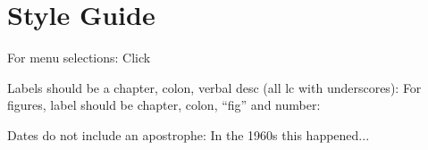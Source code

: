 \section{Style Guide}

For menu selections:
Click \textsc{}

Labels should be a chapter, colon, verbal desc (all lc with underscores): \label{03:title}
For figures, label should be chapter, colon, ``fig'' and number: \label{03:fig01}

Dates do not include an apostrophe: In the 1960s this happened...


